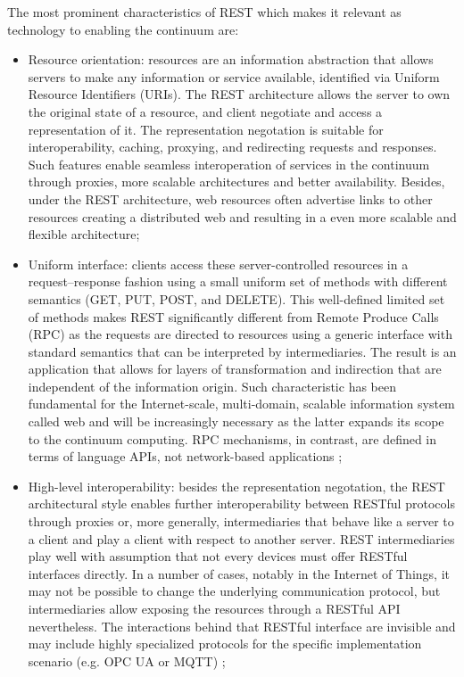The most prominent characteristics of REST which makes it relevant as technology to enabling the continuum are:

\begin{itemize}
    \item Resource orientation: resources are an information abstraction that allows servers to make any information or service available, identified via Uniform Resource Identifiers (URIs). The REST architecture allows the server to own the original state of a resource, and client negotiate and access a representation of it. The representation negotation is suitable for interoperability, caching, proxying, and redirecting requests and responses. Such features enable seamless interoperation of services in the continuum through proxies, more scalable architectures and better availability. Besides, under the REST architecture, web resources often advertise links to other resources creating a distributed web and resulting in a even more scalable and flexible architecture;
    \item Uniform interface: clients access these server-controlled resources in a request–response fashion using a small uniform set of methods with different semantics (GET, PUT, POST, and DELETE). This well-defined limited set of methods makes REST significantly different from Remote Produce Calls (RPC) as the requests are directed to resources using a generic interface with standard semantics that can be interpreted by intermediaries. The result is an application that allows for layers of transformation and indirection that are independent of the information origin. Such characteristic has been fundamental for the Internet-scale, multi-domain, scalable information system called web and will be increasingly necessary as the latter expands its scope to the continuum computing. RPC mechanisms, in contrast, are defined in terms of language APIs, not network-based applications \cite{rest};
    \item High-level interoperability: besides the representation negotation, the REST architectural style enables further interoperability between RESTful protocols through proxies or, more generally, intermediaries that behave like a server to a client and play a client with respect to another server. REST intermediaries play well with assumption that not every devices must offer RESTful interfaces directly. In a number of cases, notably in the Internet of Things, it may not be possible to change the underlying communication protocol, but intermediaries allow exposing the resources through a RESTful API nevertheless. The interactions behind that RESTful interface are invisible and may include highly specialized protocols for the specific implementation scenario (e.g. OPC UA or MQTT) \cite{web-of-things};

\end{itemize}
